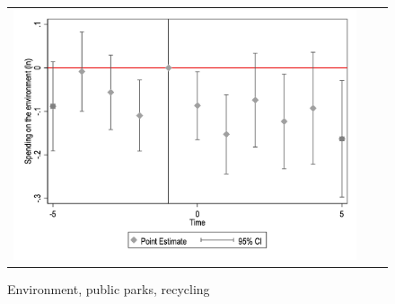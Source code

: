 \begin{figure}[ht]
\begin{tabular}{@{}ccc@{}}
\begin{minipage}[t]{0.32\textwidth}
            \caption{Environment, public parks, recycling}
            \includegraphics[width=\linewidth]{images/pop_5000/eventdd_ln_q4_09_step1.jpg}
            \label{fig:environment}
        \end{minipage}
    \end{tabular}
\end{figure}
